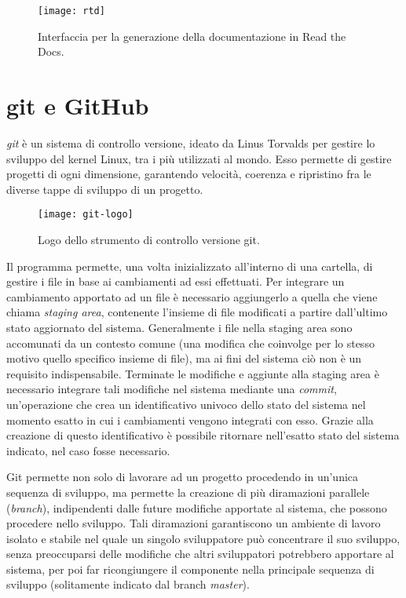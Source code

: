 \begin{figure}[h]
	\center
	\texttt{[image: rtd]}
	\caption[Schermata di build di Read the Docs.]{Interfaccia per la generazione della documentazione in Read the Docs.}
	\label{fig:rtd-build}
\end{figure}

\section{git e GitHub}
\nocite{git}
\emph{git} è un sistema di controllo versione, ideato da Linus Torvalds per
gestire lo sviluppo del kernel Linux, tra i più utilizzati al mondo.
Esso permette di gestire progetti di ogni dimensione, garantendo velocità,
coerenza e ripristino fra le diverse tappe di sviluppo di un progetto.

\begin{wrapfigure} {O} {0.35\textwidth}
	\begin{centering}	
		\texttt{[image: git-logo]}
		\caption[Logo git]{Logo dello strumento di controllo versione git.}
	\end{centering}
\end{wrapfigure}

Il programma permette, una volta inizializzato all'interno di una cartella,
di gestire i file in base ai cambiamenti ad essi effettuati. Per integrare
un cambiamento apportato ad un file è necessario aggiungerlo a quella
che viene chiama \emph{staging area}, contenente l'insieme
di file modificati a partire dall'ultimo stato aggiornato del sistema.
Generalmente i file nella staging area sono accomunati da un contesto
comune (una modifica che coinvolge per lo stesso motivo quello specifico
insieme di file), ma ai fini del sistema ciò non è un requisito indispensabile.
Terminate le modifiche e aggiunte alla staging area è necessario integrare
tali modifiche nel sistema mediante una \emph{commit}, un'operazione
che crea un identificativo univoco dello stato del sistema nel momento esatto
in cui i cambiamenti vengono integrati con esso. Grazie alla creazione
di questo identificativo è possibile ritornare nell'esatto stato
del sistema indicato, nel caso fosse necessario.

Git permette non solo di lavorare ad un progetto procedendo in un'unica
sequenza di sviluppo, ma permette la creazione di più diramazioni parallele
(\emph{branch}), indipendenti dalle future modifiche apportate al sistema,
che possono procedere nello sviluppo. Tali diramazioni garantiscono un
ambiente di lavoro isolato e stabile nel quale un singolo sviluppatore può
concentrare il suo sviluppo, senza preoccuparsi delle modifiche che altri
sviluppatori potrebbero apportare al sistema, per poi far ricongiungere
il componente nella principale sequenza di sviluppo (solitamente indicato
dal branch \emph{master}).

